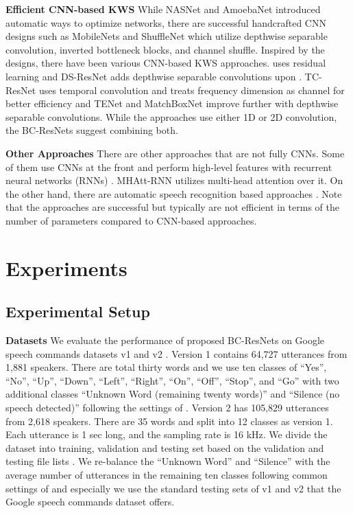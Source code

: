 \documentclass[a4paper]{article}
\begin{document}
\noindent \textbf{Efficient CNN-based KWS} While NASNet \cite{nasnet} and AmoebaNet \cite{amoeba} introduced automatic ways to optimize networks, there are successful handcrafted CNN designs such as MobileNets \cite{mobilenet1, mobilenet2} and ShuffleNet \cite{shufflenet} which utilize depthwise separable convolution, inverted bottleneck blocks, and channel shuffle. Inspired by the designs, there have been various CNN-based KWS approaches. \cite{res15} uses residual learning and DS-ResNet \cite{ds-resnet} adds depthwise separable convolutions upon \cite{res15}. TC-ResNet \cite{tcresnet} uses temporal convolution and treats frequency dimension as channel for better efficiency and TENet \cite{tenet} and MatchBoxNet \cite{matchbox} improve further with depthwise separable convolutions. While the approaches use either 1D or 2D convolution, the BC-ResNets suggest combining both.

\noindent \textbf{Other Approaches} There are other approaches that are not fully CNNs. Some of them use CNNs at the front and perform high-level features with recurrent neural networks (RNNs) \cite{att-rnn, orthogonalattn}. MHAtt-RNN \cite{mhatt-rnn} utilizes multi-head attention over it. On the other hand, there are automatic speech recognition based approaches \cite{LSTM-CTC,asrbase1}. Note that the approaches are successful but typically are not efficient in terms of the number of parameters compared to CNN-based approaches.


\section{Experiments}

\subsection{Experimental Setup}

\noindent \textbf{Datasets} We evaluate the performance of proposed BC-ResNets on Google speech commands datasets v1 and v2 \cite{speechdataset}. Version 1 contains 64,727 utterances from 1,881 speakers. There are total thirty words and we use ten classes of ``Yes'', ``No'', ``Up'', ``Down'', ``Left'', ``Right'', ``On'', ``Off'', ``Stop'', and ``Go'' with two additional classes ``Unknown Word (remaining twenty words)'' and ``Silence (no speech detected)'' following the settings of \cite{speechdataset}. Version 2 has 105,829 utterances from 2,618 speakers. There are 35 words and split into 12 classes as version 1. Each utterance is 1 sec long, and the sampling rate is 16 kHz. We divide the dataset into training, validation and testing set based on the validation and testing file lists \cite{speechdataset}. We re-balance the ``Unknown Word'' and ``Silence'' with the average number of utterances in the remaining ten classes following common settings of \cite{speechdataset, res15, mhatt-rnn} and especially we use the standard testing sets of v1 and v2 that the Google speech commands dataset offers. 
\end{document}
